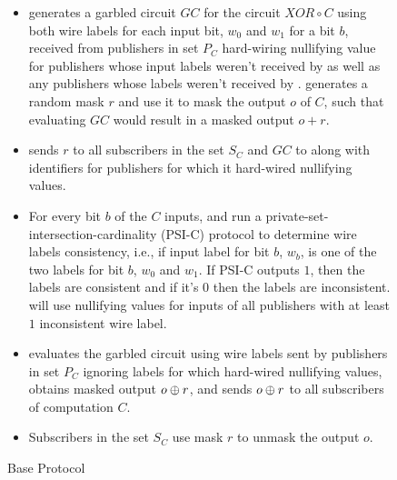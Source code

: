 \begin{figure*}[t]
\begin{mdframed}[style=myframe]
\begin{itemize}[leftmargin=*,itemsep=2pt,topsep=2pt]
	\item \garbler generates a garbled circuit $GC$ for the circuit $XOR \circ C$
		using both wire labels for each input bit, $w_0$ and $w_1$ for a bit $b$,
		received from publishers in set $P_C$ hard-wiring nullifying value for
		publishers whose input labels weren't received by \broker as well as any
		publishers whose labels weren't received by \garbler. \garbler generates a
		random mask $r$ and use it to mask the output $o$ of $C$, such that
		evaluating $GC$ would result in a masked output $o+r$.
		
	\item \garbler sends $r$ to all subscribers in the set $S_C$ and $GC$ to
		\broker along with identifiers for publishers for which it hard-wired
		nullifying values.

	\item For every bit $b$ of the $C$ inputs, \garbler and \broker run a
		private-set-intersection-cardinality (PSI-C) protocol to determine wire
		labels consistency, i.e., if \broker input label for bit $b$, $w_b$, is one
		of the two \garbler labels for bit $b$, $w_0$ and $w_1$. If PSI-C outputs
		$1$, then the labels are consistent and if it's $0$ then the labels are
		inconsistent. \garbler will use nullifying values for inputs of all
		publishers with at least $1$ inconsistent wire label. 
		
	\item \broker evaluates the garbled circuit using wire labels sent by
		publishers in set $P_C$ ignoring labels for which \garbler hard-wired
		nullifying values, obtains masked output $o \oplus r$, and sends $o \oplus r$
		to all subscribers of computation $C$.
  
	\item Subscribers in the set $S_C$ use mask $r$ to unmask the output $o$.

\end{itemize}

\end{mdframed}
\caption{Base Protocol}
\label{fig:baseprotocol}
\end{figure*}
